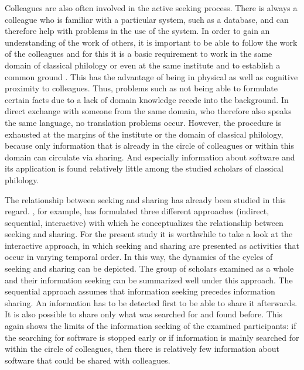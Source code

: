 \documentclass[12pt, a4paper, titlepage, oneside, abstract=true, toc=listof, toc=bibliography, BCOR=1cm]{scrreprt}
\begin{document}
{%
Colleagues are also often involved in the active seeking process. There is always a colleague who is familiar with a particular system, such as a database, and can therefore help with problems in the use of the system. In order to gain an understanding of the work of others, it is important to be able to follow the work of the colleagues and for this it is a basic requirement to work in the same domain of classical philology or even at the same institute and to establish a common ground \citep{Clark1991}. This has the advantage of being in physical as well as cognitive proximity to colleagues. Thus, problems such as not being able to formulate certain facts due to a lack of domain knowledge \citep[p. 616]{Savolainen2015a} recede into the background. In direct exchange with someone from the same domain, who therefore also speaks the same language, no translation problems occur. However, the procedure is exhausted at the margins of the institute or the domain of classical philology, because only information that is already in the circle of colleagues or within this domain can circulate via sharing. And especially information about software and its application is found relatively little among the studied scholars of classical philology. 

The relationship between seeking and sharing has already been studied in this regard. \citep[]{Savolainen2019}, for example, has formulated three different approaches (indirect, sequential, interactive) with which he conceptualizes the relationship between seeking and sharing. For the present study it is worthwhile to take a look at the interactive approach, in which seeking and sharing are presented as activities that occur in varying temporal order. In this way, the dynamics of the cycles of seeking and sharing can be depicted. The group of scholars examined as a whole and their information seeking can be summarized well under this approach. The sequential approach assumes that information seeking precedes information sharing. An information has to be detected first to be able to share it afterwards. It is also possible to share only what was searched for and found before. This again shows the limits of the information seeking of the examined participants: if the searching for software is stopped early or if information is mainly searched for within the circle of colleagues, then there is relatively few information about software that could be shared with colleagues.

}
\end{document}
